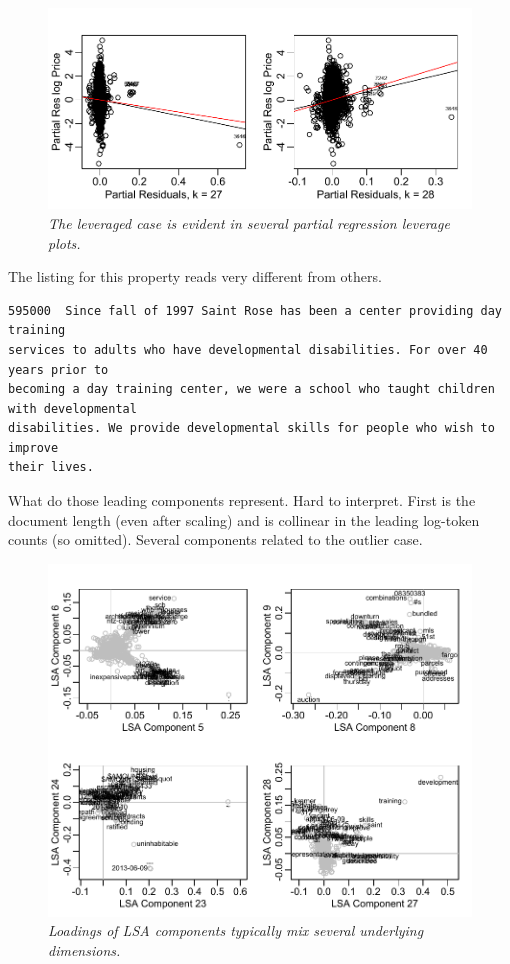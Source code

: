 \documentclass[12pt]{article}
\begin{document}
\begin{figure}
\caption{ \label{fig:leverage} {\sl The leveraged case is evident in several
partial regression leverage plots.}}
  \centerline{ \includegraphics[width=5in]{figures/leverage_plots.pdf} }
\end{figure}


The listing for this property reads very different from others.

\begin{verbatim}
595000  Since fall of 1997 Saint Rose has been a center providing day training
services to adults who have developmental disabilities. For over 40 years prior to
becoming a day training center, we were a school who taught children with developmental
disabilities. We provide developmental skills for people who wish to improve
their lives.
\end{verbatim}


What do those leading components represent.  Hard to interpret.  First is the
document length (even after scaling) and is collinear in the leading log-token
counts (so omitted).  Several components related to the outlier case.


\begin{figure}
\caption{  \label{fig:lsacomponents}  
  {\sl Loadings of LSA components typically mix several underlying dimensions.}  }
  \centerline{ \includegraphics[width=5in]{figures/lsa_components.pdf} }
\end{figure}
\end{document}
